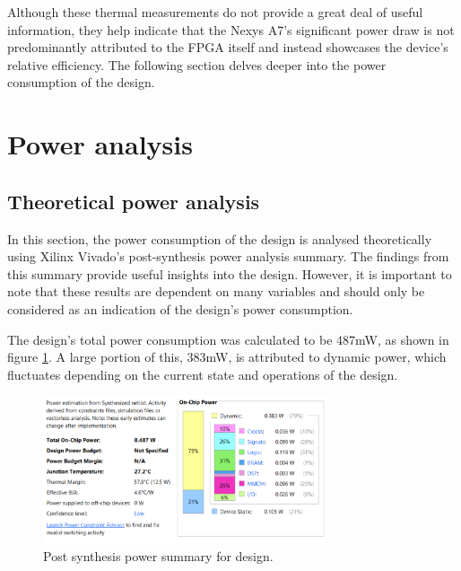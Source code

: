 Although these thermal measurements do not provide a great deal of useful information, they help indicate that the Nexys A7's significant power draw is not predominantly attributed to the FPGA itself and instead showcases the device's relative efficiency. The following section delves deeper into the power consumption of the design.




















\section{Power analysis}
\label{sec:power_analysis}

\subsection{Theoretical power analysis}

In this section, the power consumption of the design is analysed theoretically using Xilinx Vivado's post-synthesis power analysis summary. The findings from this summary provide useful insights into the design. However, it is important to note that these results are dependent on many variables and should only be considered as an indication of the design's power consumption.

The design's total power consumption was calculated to be 487mW, as shown in figure \ref{fig:post_synth_power_summary}. A large portion of this, 383mW, is attributed to dynamic power, which fluctuates depending on the current state and operations of the design.


\begin{figure}[h]
    \centering
    \includegraphics[width=0.75\textwidth]{Images/power_summary.png}
    \caption[Post synthesis power summary for design]{Post synthesis power summary for design.}
    \label{fig:post_synth_power_summary}
\end{figure}



